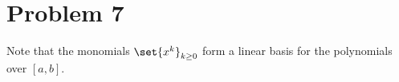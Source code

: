 \documentclass[10pt]{mypackage}
\begin{document}
\RaggedRight
\section{Problem 7}%
Note that the monomials $\set{x^{k}}_{k\geq 0}$ form a linear basis for the polynomials over $[a,b]$. 
\end{document}
